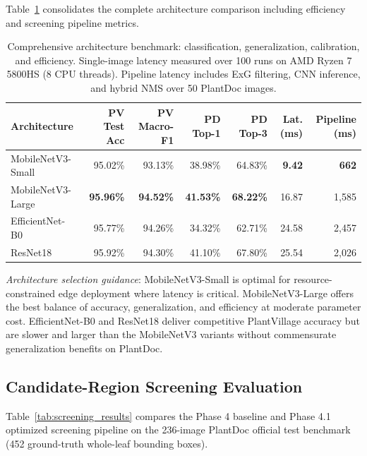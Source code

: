 \documentclass[pdflatex,sn-mathphys-num]{sn-jnl}
\begin{document}
Table~\ref{tab:full_comparison} consolidates the complete architecture comparison
including efficiency and screening pipeline metrics.

\begin{table}[H]
\caption{Comprehensive architecture benchmark: classification, generalization, calibration,
and efficiency. Single-image latency measured over 100 runs on AMD Ryzen 7 5800HS (8 CPU
threads). Pipeline latency includes ExG filtering, CNN inference, and hybrid NMS over
50 PlantDoc images.}
\label{tab:full_comparison}
\centering
\small
\begin{tabular}{lrrrrrr}
\toprule
\textbf{Architecture} & \textbf{PV Test Acc} & \textbf{PV Macro-F1} &
\textbf{PD Top-1} & \textbf{PD Top-3} & \textbf{Lat. (ms)} & \textbf{Pipeline (ms)} \\
\midrule
MobileNetV3-Small  & 95.02\% & 93.13\% & 38.98\% & 64.83\% & \textbf{9.42}  & \textbf{662} \\
MobileNetV3-Large  & \textbf{95.96\%} & \textbf{94.52\%} & \textbf{41.53\%} & \textbf{68.22\%} & 16.87 & 1{,}585 \\
EfficientNet-B0    & 95.77\% & 94.26\% & 34.32\% & 62.71\% & 24.58 & 2{,}457 \\
ResNet18           & 95.92\% & 94.30\% & 41.10\% & 67.80\% & 25.54 & 2{,}026 \\
\bottomrule
\end{tabular}
\end{table}

\textit{Architecture selection guidance}: MobileNetV3-Small is optimal for
resource-constrained edge deployment where latency is critical. MobileNetV3-Large
offers the best balance of accuracy, generalization, and efficiency at moderate
parameter cost. EfficientNet-B0 and ResNet18 deliver competitive PlantVillage accuracy
but are slower and larger than the MobileNetV3 variants without commensurate
generalization benefits on PlantDoc.

\subsection{Candidate-Region Screening Evaluation}
\label{sec:results_screening}

Table~\ref{tab:screening_results} compares the Phase 4 baseline and Phase 4.1 optimized
screening pipeline on the 236-image PlantDoc official test benchmark (452 ground-truth
whole-leaf bounding boxes).
\end{document}
